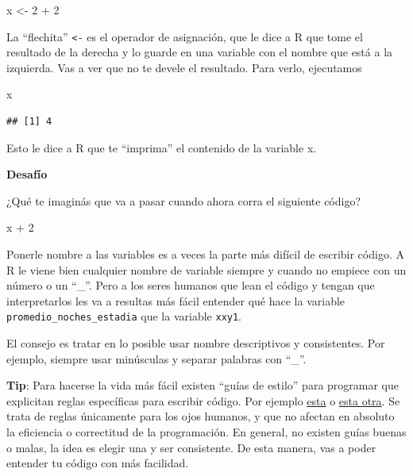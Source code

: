 \documentclass[
  openany]{book}
\newenvironment{Shaded}{\begin{snugshade}}{\end{snugshade}}
\newcommand{\DecValTok}[1]{\textcolor[rgb]{0.00,0.00,0.81}{#1}}
\newcommand{\NormalTok}[1]{#1}
\newcommand{\OtherTok}[1]{\textcolor[rgb]{0.56,0.35,0.01}{#1}}
\newcommand{\SpecialCharTok}[1]{\textcolor[rgb]{0.00,0.00,0.00}{#1}}
\begin{document}
\begin{Shaded}
\begin{Highlighting}[]
\NormalTok{x }\OtherTok{\textless{}{-}} \DecValTok{2} \SpecialCharTok{+} \DecValTok{2}
\end{Highlighting}
\end{Shaded}

La ``flechita'' \texttt{\textless{}-} es el operador de asignación, que le dice a R que tome el resultado de la derecha y lo guarde en una variable con el nombre que está a la izquierda.
Vas a ver que no te devele el resultado.
Para verlo, ejecutamos

\begin{Shaded}
\begin{Highlighting}[]
\NormalTok{x}
\end{Highlighting}
\end{Shaded}

\begin{verbatim}
## [1] 4
\end{verbatim}

Esto le dice a R que te ``imprima'' el contenido de la variable x.

\textbf{Desafío}

¿Qué te imaginás que va a pasar cuando ahora corra el siguiente código?

\begin{Shaded}
\begin{Highlighting}[]
\NormalTok{x }\SpecialCharTok{+} \DecValTok{2}
\end{Highlighting}
\end{Shaded}

Ponerle nombre a las variables es a veces la parte más difícil de escribir código.
A R le viene bien cualquier nombre de variable siempre y cuando no empiece con un número o un ``\_''.
Pero a los seres humanos que lean el código y tengan que interpretarlos les va a resultas más fácil entender qué hace la variable \texttt{promedio\_noches\_estadia} que la variable \texttt{xxy1}.

El consejo es tratar en lo posible usar nombre descriptivos y consistentes.
Por ejemplo, siempre usar minúsculas y separar palabras con ``\_''.

\textbf{Tip}: Para hacerse la vida más fácil existen ``guías de estilo'' para programar que explicitan reglas específicas para escribir código.
Por ejemplo \href{https://rpubs.com/FvD/guia-estilo-r}{esta} o \href{https://github.com/eliocamp/tesis/blob/master/docs/gu\%C3\%ADa_de_estilo.md}{esta otra}.
Se trata de reglas únicamente para los ojos humanos, y que no afectan en absoluto la eficiencia o correctitud de la programación.
En general, no existen guías buenas o malas, la idea es elegir una y ser consistente.
De esta manera, vas a poder entender tu código con más facilidad.
\end{document}
